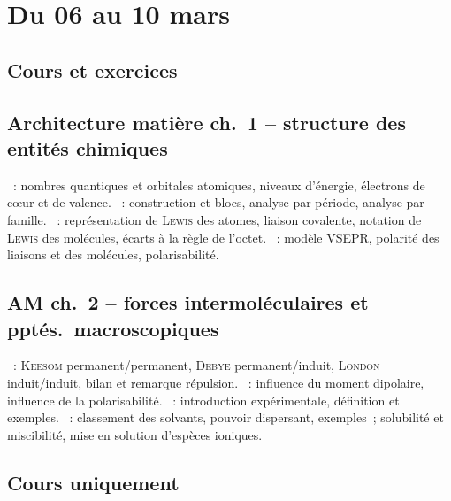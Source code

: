 \documentclass[a4paper, 12pt, final, garamond]{book}
\begin{document}
\setcounter{chapter}{18}

\chapter{Du 06 au 10 mars}

\section{Cours et exercices}
\section*{Architecture matière ch.\ 1 -- structure des entités chimiques}
\begin{enumerate}[label=\Roman*]
    ~: nombres quantiques et
        orbitales atomiques, niveaux d'énergie, électrons de cœur et de valence.
    ~: construction et blocs, analyse par période,
        analyse par famille.
    ~: représentation de
        \textsc{Lewis} des atomes, liaison covalente, notation de \textsc{Lewis}
        des molécules, écarts à la règle de l'octet.
    ~: modèle VSEPR, polarité
        des liaisons et des molécules, polarisabilité.
\end{enumerate}

\section*{AM ch.\ 2 -- forces intermoléculaires et pptés.\ macroscopiques}
\begin{enumerate}[label=\Roman*]
    ~: \textsc{Keesom}
        permanent/permanent, \textsc{Debye} permanent/induit, \textsc{London}
        induit/induit, bilan et remarque répulsion.
    ~: influence du moment dipolaire,
        influence de la polarisabilité.
    ~: introduction expérimentale, définition et
        exemples.
    ~: classement des solvants, pouvoir dispersant, exemples~; 
        solubilité et miscibilité, mise en solution d'espèces ioniques.
\end{enumerate}

\section{Cours uniquement}
\end{document}
